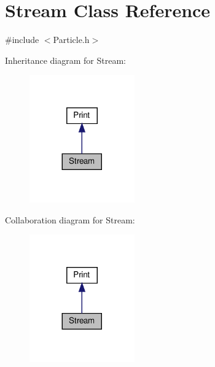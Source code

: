 \hypertarget{class_stream}{}\section{Stream Class Reference}
\label{class_stream}


{\ttfamily \#include $<$Particle.\+h$>$}



Inheritance diagram for Stream\+:
\nopagebreak
\begin{figure}[H]
\begin{center}
\leavevmode
\includegraphics[width=128pt]{class_stream__inherit__graph}
\end{center}
\end{figure}


Collaboration diagram for Stream\+:
\nopagebreak
\begin{figure}[H]
\begin{center}
\leavevmode
\includegraphics[width=128pt]{class_stream__coll__graph}
\end{center}
\end{figure}
